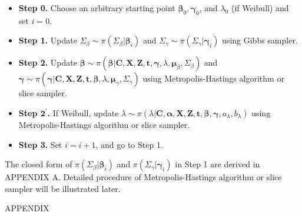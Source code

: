 \documentclass[a4paper, 12pt]{article}
\makeatletter
\renewcommand{\section}{\@startsection
	{section}    {1}    {0mm}    {-0.7\baselineskip}    {0.08\baselineskip}    {\normalfont\large\sc\center\bf}}
\makeatother
\begin{document}
\begin{itemize}
	\item[] {\textbf{Step 0.}} Choose an arbitrary starting point $\mathbf{\beta}_0, \mathbf{\gamma}_0$, and $\lambda_0$ (if Weibull) and set $i = 0$.
	\item[] {\textbf{Step 1.}} Update $\Sigma_{\beta} \sim \pi(\Sigma_{\beta}|\mathbf{\beta}_i)$ and $\Sigma_{\gamma} \sim \pi(\Sigma_{\gamma}|\mathbf{\gamma}_i)$ using Gibbs sampler.
	\item[] {\textbf{Step 2.}} Update $\mathbf{\beta}\sim \pi(\mathbf{\beta}|\mathbf{C}, \mathbf{X}, \mathbf{Z}, \mathbf{t}, \mathbf{\gamma}, \lambda, \mathbf{\mu}_{\beta}, \Sigma_{\beta})$ and $\mathbf{\gamma}\sim \pi(\mathbf{\gamma}|\mathbf{C}, \mathbf{X}, \mathbf{Z}, \mathbf{t}, \mathbf{\beta}, \lambda, \mathbf{\mu}_{\gamma}, \Sigma_{\gamma})$ using Metropolis-Hastings algorithm or slice sampler. 
		\item[] {\textbf{Step $\mathbf{2}^\prime$.}} If Weibull, update $\lambda \sim \pi(\lambda|\mathbf{C}, \mathbf{\alpha}, \mathbf{X}, \mathbf{Z}, \mathbf{t}, \mathbf{\beta}, \mathbf{\gamma}, a_{\lambda}, b_{\lambda})$  using Metropolis-Hastings algorithm or slice sampler.
	\item[] {\textbf{Step 3.}} Set $i = i + 1$, and go to Step 1.
\end{itemize}
The closed form of $\pi(\Sigma_{\beta}|\mathbf{\beta}_i)$ and $\pi(\Sigma_{\gamma}|\mathbf{\gamma}_i)$ in Step 1 are derived in APPENDIX A. Detailed procedure of Metropolis-Hastings algorithm or slice sampler will be illustrated later.
\section{APPENDIX}
\end{document}

